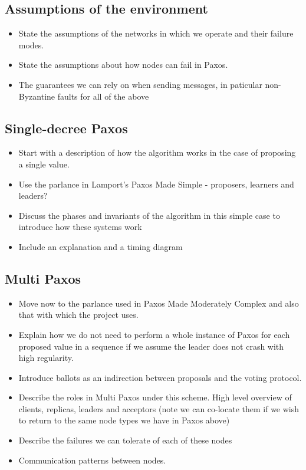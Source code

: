 \documentclass[12pt,twoside,notitlepage]{report}
\begin{document}
\subsection{Assumptions of the environment}

\begin{itemize}
  \item State the assumptions of the networks in which we operate and their failure modes.
  \item State the assumptions about how nodes can fail in Paxos.
  \item The guarantees we can rely on when sending messages, in paticular non-Byzantine faults for all of the above
\end{itemize}

\subsection{Single-decree Paxos}

\begin{itemize}
  \item Start with a description of how the algorithm works in the case of proposing a single value.
  \item Use the parlance in Lamport's Paxos Made Simple - proposers, learners and leaders?
  \item Discuss the phases and invariants of the algorithm in this simple case to introduce how these systems work
  \item Include an explanation and a timing diagram
\end{itemize}

\subsection{Multi Paxos}
\begin{itemize}
  \item Move now to the parlance used in Paxos Made Moderately Complex and also that with which the project uses.
  \item Explain how we do not need to perform a whole instance of Paxos for each proposed value in a sequence if we assume the leader does not crash with high regularity.
  \item Introduce ballots as an indirection between proposals and the voting protocol.
  \item Describe the roles in Multi Paxos under this scheme. High level overview of clients, replicas, leaders and acceptors (note we can co-locate them if we wish to return to the same node types we have in Paxos above)
  \item Describe the failures we can tolerate of each of these nodes
  \item Communication patterns between nodes.
\end{itemize}
\end{document}
